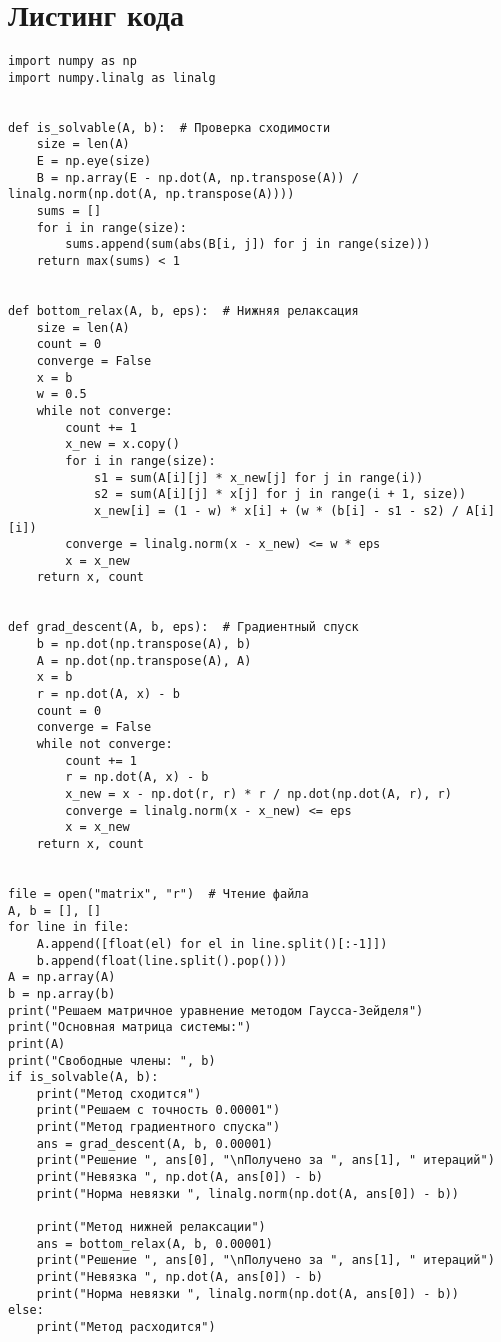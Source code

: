 \documentclass[11.4pt]{article}
\begin{document}
\section{Листинг кода}
\begin{verbatim}
import numpy as np
import numpy.linalg as linalg


def is_solvable(A, b):  # Проверка сходимости
    size = len(A)
    E = np.eye(size)
    B = np.array(E - np.dot(A, np.transpose(A)) / linalg.norm(np.dot(A, np.transpose(A))))
    sums = []
    for i in range(size):
        sums.append(sum(abs(B[i, j]) for j in range(size)))
    return max(sums) < 1


def bottom_relax(A, b, eps):  # Нижняя релаксация
    size = len(A)
    count = 0
    converge = False
    x = b
    w = 0.5
    while not converge:
        count += 1
        x_new = x.copy()
        for i in range(size):
            s1 = sum(A[i][j] * x_new[j] for j in range(i))
            s2 = sum(A[i][j] * x[j] for j in range(i + 1, size))
            x_new[i] = (1 - w) * x[i] + (w * (b[i] - s1 - s2) / A[i][i])
        converge = linalg.norm(x - x_new) <= w * eps
        x = x_new
    return x, count


def grad_descent(A, b, eps):  # Градиентный спуск
    b = np.dot(np.transpose(A), b)
    A = np.dot(np.transpose(A), A)
    x = b
    r = np.dot(A, x) - b
    count = 0
    converge = False
    while not converge:
        count += 1
        r = np.dot(A, x) - b
        x_new = x - np.dot(r, r) * r / np.dot(np.dot(A, r), r)
        converge = linalg.norm(x - x_new) <= eps
        x = x_new
    return x, count


file = open("matrix", "r")  # Чтение файла
A, b = [], []
for line in file:
    A.append([float(el) for el in line.split()[:-1]])
    b.append(float(line.split().pop()))
A = np.array(A)
b = np.array(b)
print("Решаем матричное уравнение методом Гаусса-Зейделя")
print("Основная матрица системы:")
print(A)
print("Свободные члены: ", b)
if is_solvable(A, b):
    print("Метод сходится")
    print("Решаем с точность 0.00001")
    print("Метод градиентного спуска")
    ans = grad_descent(A, b, 0.00001)
    print("Решение ", ans[0], "\nПолучено за ", ans[1], " итераций")
    print("Невязка ", np.dot(A, ans[0]) - b)
    print("Норма невязки ", linalg.norm(np.dot(A, ans[0]) - b))

    print("Метод нижней релаксации")
    ans = bottom_relax(A, b, 0.00001)
    print("Решение ", ans[0], "\nПолучено за ", ans[1], " итераций")
    print("Невязка ", np.dot(A, ans[0]) - b)
    print("Норма невязки ", linalg.norm(np.dot(A, ans[0]) - b))
else:
    print("Метод расходится")

\end{verbatim}
\end{document}
